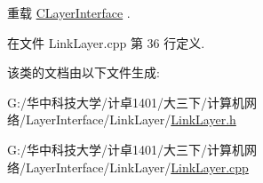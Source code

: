 重载 \hyperlink{class_c_layer_interface_a02a144b97e69df2dc47149e5314cba2d}{C\+Layer\+Interface} .



在文件 Link\+Layer.\+cpp 第 36 行定义.



该类的文档由以下文件生成\+:\begin{DoxyCompactItemize}
\item 
G\+:/华中科技大学/计卓1401/大三下/计算机网络/\+Layer\+Interface/\+Link\+Layer/\hyperlink{_link_layer_8h}{Link\+Layer.\+h}\item 
G\+:/华中科技大学/计卓1401/大三下/计算机网络/\+Layer\+Interface/\+Link\+Layer/\hyperlink{_link_layer_8cpp}{Link\+Layer.\+cpp}\end{DoxyCompactItemize}
